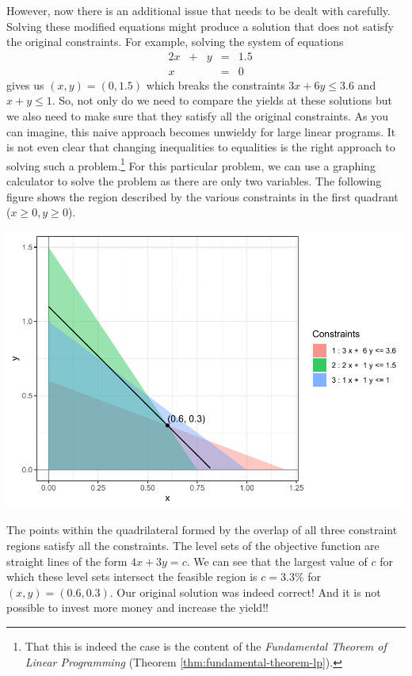 \documentclass[
]{book}
\theoremstyle{definition}
\theoremstyle{definition}
\theoremstyle{definition}
\theoremstyle{definition}
\theoremstyle{remark}
\begin{document}
However, now there is an additional issue that needs to be dealt with carefully. Solving these modified equations might produce a solution that does not satisfy the original constraints. For example, solving the system of equations
\begin{equation*}
  \begin{array}{rrrrrl}
    & 2x & + & y & = & 1.5 \\
    & x  &  &  & = & 0
  \end{array}
\end{equation*}
gives us \((x, y) = (0, 1.5)\) which breaks the constraints \(3x + 6y \le 3.6\) and \(x + y \le 1\). So, not only do we need to compare the yields at these solutions but we also need to make sure that they satisfy all the original constraints.
As you can imagine, this naive approach becomes unwieldy for large linear programs.
It is not even clear that changing inequalities to equalities is the right approach to solving such a problem.\footnote{That this is indeed the case is the content of the \emph{Fundamental Theorem of Linear Programming} (Theorem \ref{thm:fundamental-theorem-lp}).}
For this particular problem, we can use a graphing calculator to solve the problem as there are only two variables.
The following figure shows the region described by the various constraints in the first quadrant (\(x \ge 0, y \ge 0\)).

\includegraphics{Introduction-to-Optimization_files/figure-latex/fig-bond-portfolio-1.pdf}

The points within the quadrilateral formed by the overlap of all three constraint regions satisfy all the constraints. The level sets of the objective function are straight lines of the form \(4x + 3y = c\). We can see that the largest value of \(c\) for which these level sets intersect the feasible region is \(c = 3.3\%\) for \((x, y) = (0.6, 0.3)\).
Our original solution was indeed correct! And it is not possible to invest more money and increase the yield!!
\end{document}
